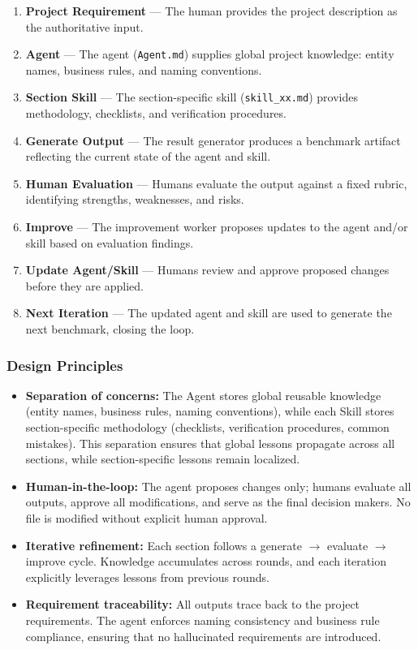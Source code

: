 \begin{enumerate}
    \item \textbf{Project Requirement} --- The human provides the project description as the authoritative input.
    \item \textbf{Agent} --- The agent (\texttt{Agent.md}) supplies global project knowledge: entity names, business rules, and naming conventions.
    \item \textbf{Section Skill} --- The section-specific skill (\texttt{skill\_xx.md}) provides methodology, checklists, and verification procedures.
    \item \textbf{Generate Output} --- The result generator produces a benchmark artifact reflecting the current state of the agent and skill.
    \item \textbf{Human Evaluation} --- Humans evaluate the output against a fixed rubric, identifying strengths, weaknesses, and risks.
    \item \textbf{Improve} --- The improvement worker proposes updates to the agent and/or skill based on evaluation findings.
    \item \textbf{Update Agent/Skill} --- Humans review and approve proposed changes before they are applied.
    \item \textbf{Next Iteration} --- The updated agent and skill are used to generate the next benchmark, closing the loop.
\end{enumerate}

\subsubsection{Design Principles}

\begin{itemize}
    \item \textbf{Separation of concerns:} The Agent stores global reusable knowledge (entity names, business rules, naming conventions), while each Skill stores section-specific methodology (checklists, verification procedures, common mistakes). This separation ensures that global lessons propagate across all sections, while section-specific lessons remain localized.
    \item \textbf{Human-in-the-loop:} The agent proposes changes only; humans evaluate all outputs, approve all modifications, and serve as the final decision makers. No file is modified without explicit human approval.
    \item \textbf{Iterative refinement:} Each section follows a generate $\rightarrow$ evaluate $\rightarrow$ improve cycle. Knowledge accumulates across rounds, and each iteration explicitly leverages lessons from previous rounds.
    \item \textbf{Requirement traceability:} All outputs trace back to the project requirements. The agent enforces naming consistency and business rule compliance, ensuring that no hallucinated requirements are introduced.
\end{itemize}

